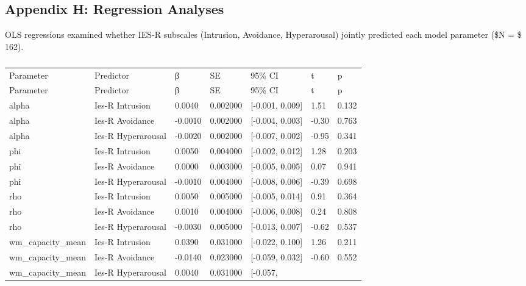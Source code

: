 \documentclass{article}
\begin{document}
\subsection{Appendix H: Regression Analyses}\label{sec-regressions}

OLS regressions examined whether IES-R subscales (Intrusion, Avoidance,
Hyperarousal) jointly predicted each model parameter (\$N = \$ 162).

\begin{longtable}[]{@{}lllllll@{}}

\caption{\label{tbl-regression}Multiple OLS regression of winning model
parameters on IES-R subscales (Intrusion, Avoidance, Hyperarousal). Beta
= unstandardized coefficient.}

\tabularnewline

\caption{}\label{T_b7778}\tabularnewline
\toprule\noalign{}
Parameter & Predictor & β & SE & 95\% CI & t & p \\
\midrule\noalign{}
\endfirsthead
\toprule\noalign{}
Parameter & Predictor & β & SE & 95\% CI & t & p \\
\midrule\noalign{}
\endhead
\bottomrule\noalign{}
\endlastfoot
alpha & Ies-R Intrusion & 0.0040 & 0.002000 & {[}-0.001, 0.009{]} & 1.51
& 0.132 \\
alpha & Ies-R Avoidance & -0.0010 & 0.002000 & {[}-0.004, 0.003{]} &
-0.30 & 0.763 \\
alpha & Ies-R Hyperarousal & -0.0020 & 0.002000 & {[}-0.007, 0.002{]} &
-0.95 & 0.341 \\
phi & Ies-R Intrusion & 0.0050 & 0.004000 & {[}-0.002, 0.012{]} & 1.28 &
0.203 \\
phi & Ies-R Avoidance & 0.0000 & 0.003000 & {[}-0.005, 0.005{]} & 0.07 &
0.941 \\
phi & Ies-R Hyperarousal & -0.0010 & 0.004000 & {[}-0.008, 0.006{]} &
-0.39 & 0.698 \\
rho & Ies-R Intrusion & 0.0050 & 0.005000 & {[}-0.005, 0.014{]} & 0.91 &
0.364 \\
rho & Ies-R Avoidance & 0.0010 & 0.004000 & {[}-0.006, 0.008{]} & 0.24 &
0.808 \\
rho & Ies-R Hyperarousal & -0.0030 & 0.005000 & {[}-0.013, 0.007{]} &
-0.62 & 0.537 \\
wm\_capacity\_mean & Ies-R Intrusion & 0.0390 & 0.031000 & {[}-0.022,
0.100{]} & 1.26 & 0.211 \\
wm\_capacity\_mean & Ies-R Avoidance & -0.0140 & 0.023000 & {[}-0.059,
0.032{]} & -0.60 & 0.552 \\
wm\_capacity\_mean & Ies-R Hyperarousal & 0.0040 & 0.031000 & {[}-0.057,

\end{longtable}
\end{document}
